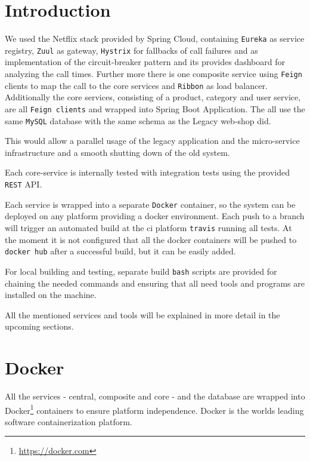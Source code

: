 \documentclass[11pt]{article}
\begin{document}
	\tableofcontents
	\newpage
	
	\section{Introduction}	
	We used the Netflix stack provided by Spring Cloud, containing \texttt{Eureka} as service registry, \texttt{Zuul} as gateway, \texttt{Hystrix} for fallbacks of call failures and as implementation of the circuit-breaker pattern and its provides dashboard for analyzing the call times. Further more there is one composite service using \texttt{Feign} clients to map the call to the core services and \texttt{Ribbon} as load balancer. Additionally the core services, consisting of a product, category and user service, are all \texttt{Feign clients} and wrapped into Spring Boot Application. The all use the same \texttt{MySQL} database with the same schema as the Legacy web-shop did.
	
	This would allow a parallel usage of the legacy application and the micro-service infrastructure and a smooth shutting down of the old system.
	
	Each core-service is internally tested with integration tests using the provided \texttt{REST} API.
	
	Each service is wrapped into a separate \texttt{Docker} container, so the system can be deployed on any platform providing a docker environment. Each push to a branch will trigger an automated build at the ci platform \texttt{travis} running all tests. At the moment it is not configured that all the docker containers will be pushed to \texttt{docker hub} after a successful build, but it can be easily added.
	
	For local building and testing, separate build \texttt{bash} scripts are provided for chaining the needed commands and ensuring that all need tools and programs are installed on the machine.
	
	All the mentioned services and tools will be explained in more detail in the upcoming sections.
	\section{Docker}
	All the services - central, composite and core - and the database are wrapped into Docker\footnote{\url{https://docker.com}} containers to ensure platform independence. Docker is the worlds leading software containerization platform. 
\end{document}
